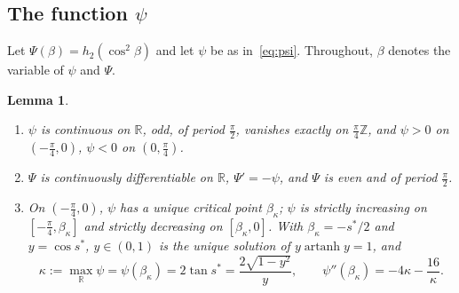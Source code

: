 \documentclass[11pt]{article}
\DeclareMathOperator{\artanh}{artanh}
\newcommand{\R}{\mathbb{R}}
\newcommand{\Z}{\mathbb{Z}}
\theoremstyle{plain}
\newtheorem{lemma}[theorem]{Lemma}
\theoremstyle{definition}
\theoremstyle{remark}
\begin{document}
\subsection{The function \texorpdfstring{$\psi$}{psi}}

Let $\Psi(\beta)=h_2(\cos^2\beta)$ and let $\psi$ be as in~\eqref{eq:psi}. Throughout, $\beta$ denotes the variable of $\psi$
and $\Psi$.

\begin{lemma}\label{lem:psi}
\begin{enumerate}
\item[(a)] $\psi$ is continuous on $\R$, odd, of period $\frac\pi2$, vanishes exactly on $\frac\pi4\Z$, and $\psi>0$ on
$(-\frac\pi4,0)$, $\psi<0$ on $(0,\frac\pi4)$.
\item[(b)] $\Psi$ is continuously differentiable on $\R$, $\Psi'=-\psi$, and $\Psi$ is even and of period $\frac\pi2$.
\item[(c)] On $(-\frac\pi4,0)$, $\psi$ has a unique critical point $\beta_\kappa$; $\psi$ is strictly increasing on
$[-\frac\pi4,\beta_\kappa]$ and strictly decreasing on $[\beta_\kappa,0]$. With $\beta_\kappa=-s^*/2$ and $y=\cos s^*$, $y\in(0,1)$ is
the unique solution of $y\artanh y=1$, and
\[
  \kappa:=\max_\R\psi=\psi(\beta_\kappa)=2\tan s^*=\frac{2\sqrt{1-y^2}}{y},\qquad \psi''(\beta_\kappa)=-4\kappa-\frac{16}\kappa .
\]
\end{enumerate}
\end{lemma}
\end{document}
